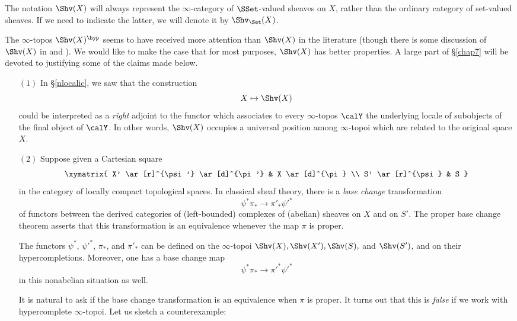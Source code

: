 \begin{warning}
The notation $\Shv(X)$ will always represent the $\infty$-category of $\SSet$-valued
sheaves on $X$, rather than the ordinary category of set-valued sheaves. If we need to
indicate the latter, we will denote it by $\Shv_{\Set}(X)$.
\end{warning}

The $\infty$-topos $\Shv(X)^{\hyp}$ seems to have received more attention than $\Shv(X)$ in the literature (though there is some discussion of $\Shv(X)$ in \cite{hollander} and \cite{toen}).
We would like to make the case that for most purposes, $\Shv(X)$ has better properties.
A large part of \S \ref{chap7} will be devoted to justifying some of the claims made below.

\begin{itemize}

\item[$(1)$] In \S \ref{nlocalic}, we saw that the construction
$$ X \mapsto \Shv(X)$$
could be interpreted as a {\em right} adjoint to the functor which associates to every
$\infty$-topos $\calY$ the underlying locale of subobjects of the final object of $\calY$.
In other words, $\Shv(X)$ occupies a universal position among $\infty$-topoi which are related to the original space $X$.

\item[$(2)$] Suppose given a Cartesian square
$$ \xymatrix{ X' \ar[r]^{\psi'} \ar[d]^{\pi'} & X \ar[d]^{\pi} \\
S' \ar[r]^{\psi} & S }$$
in the category of locally compact topological spaces.
In classical sheaf theory, there is a {\it base change} transformation
$$\psi^{\ast} \pi_{\ast} \rightarrow \pi'_{\ast} \psi'^{\ast}$$
of functors between the derived categories of (left-bounded) complexes of (abelian) sheaves
on $X$ and on $S'$. The proper base change theorem
asserts that this transformation is an equivalence whenever the
map $\pi$ is proper.

The functors $\psi^{\ast}$, ${\psi'}^{\ast}$, $\pi_{\ast}$, and $\pi'_{\ast}$
can be defined on the $\infty$-topoi $\Shv(X), \Shv(X'), \Shv(S),$ and $\Shv(S')$, and on their hypercompletions. Moreover, one has a base change map
$$\psi^{\ast} \pi_{\ast} \rightarrow \pi'^{\ast} {\psi'}^{\ast}$$
in this nonabelian situation as well. 

It is natural to ask if the
base change transformation is an equivalence when $\pi$ is proper.
It turns out that this is {\em false} if we work with hypercomplete $\infty$-topoi.
Let us sketch a counterexample:


\end{itemize}
